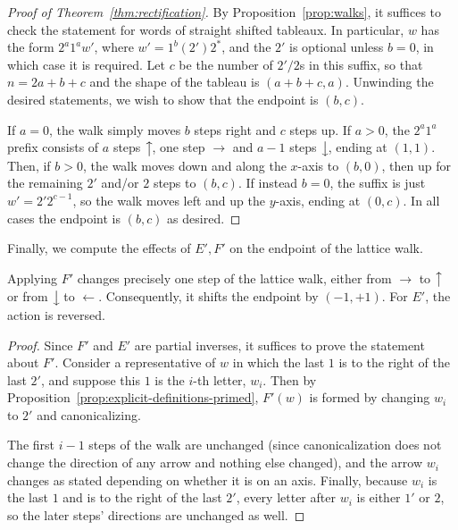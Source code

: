 \documentclass[ALCO,ThmDefs,Unicode,epreuves]{cedram}
\newcommand{\east}[1]{\ensuremath{\xrightarrow{\ #1\ }}}
\newcommand{\west}[1]{\ensuremath{\xleftarrow{\ #1\ }}}
\newcommand{\north}[1]{\ensuremath{\big \uparrow \!\text{\raisebox{.1ex}{\scriptsize $#1$}}}}
\newcommand{\south}[1]{\ensuremath{\big \downarrow \!\text{\raisebox{.1ex}{\scriptsize $#1$}}}}
\begin{document}
\begin{proof}[Proof of Theorem~\ref{thm:rectification}]
By Proposition~\ref{prop:walks}, it suffices to check the statement for words of straight shifted tableaux. In particular, $w$ has the form $2^a 1^a w'$, where $w' = 1^b (2')2^*$, and the $2'$ is optional unless $b=0$, in which case it is required. Let $c$ be the number of $2'/2$s in this suffix, so that $n = 2a + b + c$ and the shape of the tableau is $(a+b+c,a)$. Unwinding the desired statements, we wish to show that the endpoint is $(b,c)$.

If $a=0$, the walk simply moves $b$ steps right and $c$ steps up. If $a>0$, the $2^a1^a$ prefix consists of $a$ steps $\north{}$, one step $\east{}$ and $a-1$ steps $\south{}$, ending at $(1,1)$. Then, if $b>0$, the walk moves down and along the $x$-axis to $(b,0)$, then up for the remaining $2'$ and/or $2$ steps to $(b,c)$. If instead $b=0$, the suffix is just $w' = 2'2^{c-1}$, so the walk moves left and up the $y$-axis, ending at $(0,c)$. In all cases the endpoint is $(b,c)$ as desired.
\end{proof}

Finally, we compute the effects of $E',F'$ on the endpoint of the lattice walk.

\begin{prop} \label{prop:primed-lattice-endpoint}
Applying $F'$ changes precisely one step of the lattice walk, either from $\east{}$ to $\north{}$ or from $\south{}$ to $\west{}$. Consequently, it shifts the endpoint by $(-1,+1)$. For $E'$, the action is reversed.
\end{prop}

\begin{proof}
Since $F'$ and $E'$ are partial inverses, it suffices to prove the statement about $F'$. Consider a representative of $w$ in which the last $1$ is to the right of the last $2'$, and suppose this $1$ is the $i$-th letter, $w_i$. Then by Proposition~\ref{prop:explicit-definitions-primed}, $F'(w)$ is formed by changing $w_i$ to $2'$ and canonicalizing. 

The first $i-1$ steps of the walk are unchanged (since canonicalization does not change the direction of any arrow and nothing else changed), and the arrow $w_i$ changes as stated depending on whether it is on an axis. Finally, because $w_i$ is the last $1$ and is to the right of the last $2'$, every letter after $w_i$ is either $1'$ or $2$, so the later steps' directions are unchanged as well.
\end{proof}
\end{document}
